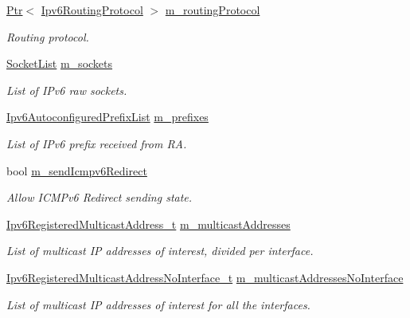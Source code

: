 \begin{DoxyCompactItemize}
\hyperlink{classns3_1_1Ptr}{Ptr}$<$ \hyperlink{classns3_1_1Ipv6RoutingProtocol}{Ipv6\+Routing\+Protocol} $>$ \hyperlink{classns3_1_1Ipv6L3Protocol_aa0df547e5240b218dc1f4742a2a00117}{m\+\_\+routing\+Protocol}
\begin{DoxyCompactList}\small\item\em Routing protocol. \end{DoxyCompactList}\item 
\hyperlink{classns3_1_1Ipv6L3Protocol_ab5dd63c7563ecb5ac6a2b019ad7fa484}{Socket\+List} \hyperlink{classns3_1_1Ipv6L3Protocol_a515e9cba13d7fd95e5613f5c95ccc7b5}{m\+\_\+sockets}
\begin{DoxyCompactList}\small\item\em List of I\+Pv6 raw sockets. \end{DoxyCompactList}\item 
\hyperlink{classns3_1_1Ipv6L3Protocol_a9da53420c273775a4a089b4d2273e38f}{Ipv6\+Autoconfigured\+Prefix\+List} \hyperlink{classns3_1_1Ipv6L3Protocol_a402d76e60e8ac25eeb200d2b288732c0}{m\+\_\+prefixes}
\begin{DoxyCompactList}\small\item\em List of I\+Pv6 prefix received from RA. \end{DoxyCompactList}\item 
bool \hyperlink{classns3_1_1Ipv6L3Protocol_a23aef420bfb1d9dd634681c4a78a0352}{m\+\_\+send\+Icmpv6\+Redirect}
\begin{DoxyCompactList}\small\item\em Allow I\+C\+M\+Pv6 Redirect sending state. \end{DoxyCompactList}\item 
\hyperlink{classns3_1_1Ipv6L3Protocol_a42035d08aa8b69e38952370622db7f80}{Ipv6\+Registered\+Multicast\+Address\+\_\+t} \hyperlink{classns3_1_1Ipv6L3Protocol_a6d7573453cf2a73d44bfb2d68eed19c4}{m\+\_\+multicast\+Addresses}
\begin{DoxyCompactList}\small\item\em List of multicast IP addresses of interest, divided per interface. \end{DoxyCompactList}\item 
\hyperlink{classns3_1_1Ipv6L3Protocol_a21d330eef03b790c7ff3330abfa738fa}{Ipv6\+Registered\+Multicast\+Address\+No\+Interface\+\_\+t} \hyperlink{classns3_1_1Ipv6L3Protocol_a4b31a418ae742bed8835981afb433b1c}{m\+\_\+multicast\+Addresses\+No\+Interface}
\begin{DoxyCompactList}\small\item\em List of multicast IP addresses of interest for all the interfaces. \end{DoxyCompactList}\end{DoxyCompactItemize}
